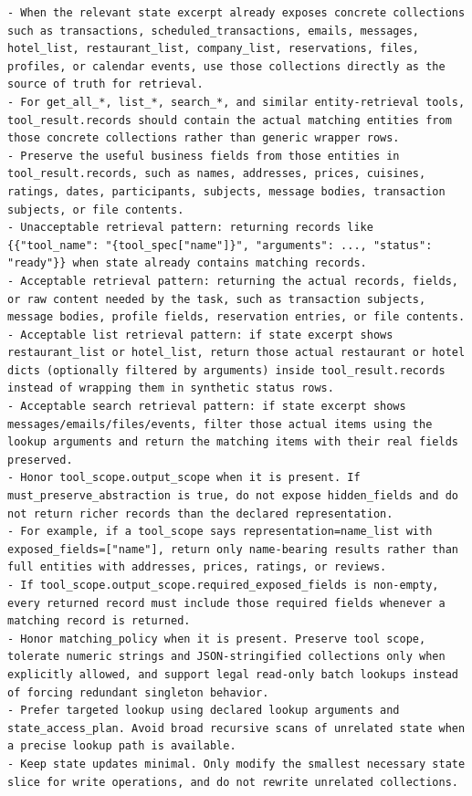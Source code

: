 \documentclass{llmxive}
\begin{document}
\begin{tcolorbox}[promptbox,title={Tool-Code Generator Prompt}]
\begin{Verbatim}[breaklines=true, breakanywhere=true, fontsize=\scriptsize, breaksymbolleft={}]
- When the relevant state excerpt already exposes concrete collections such as transactions, scheduled_transactions, emails, messages, hotel_list, restaurant_list, company_list, reservations, files, profiles, or calendar events, use those collections directly as the source of truth for retrieval.
- For get_all_*, list_*, search_*, and similar entity-retrieval tools, tool_result.records should contain the actual matching entities from those concrete collections rather than generic wrapper rows.
- Preserve the useful business fields from those entities in tool_result.records, such as names, addresses, prices, cuisines, ratings, dates, participants, subjects, message bodies, transaction subjects, or file contents.
- Unacceptable retrieval pattern: returning records like {{"tool_name": "{tool_spec["name"]}", "arguments": ..., "status": "ready"}} when state already contains matching records.
- Acceptable retrieval pattern: returning the actual records, fields, or raw content needed by the task, such as transaction subjects, message bodies, profile fields, reservation entries, or file contents.
- Acceptable list retrieval pattern: if state excerpt shows restaurant_list or hotel_list, return those actual restaurant or hotel dicts (optionally filtered by arguments) inside tool_result.records instead of wrapping them in synthetic status rows.
- Acceptable search retrieval pattern: if state excerpt shows messages/emails/files/events, filter those actual items using the lookup arguments and return the matching items with their real fields preserved.
- Honor tool_scope.output_scope when it is present. If must_preserve_abstraction is true, do not expose hidden_fields and do not return richer records than the declared representation.
- For example, if a tool_scope says representation=name_list with exposed_fields=["name"], return only name-bearing results rather than full entities with addresses, prices, ratings, or reviews.
- If tool_scope.output_scope.required_exposed_fields is non-empty, every returned record must include those required fields whenever a matching record is returned.
- Honor matching_policy when it is present. Preserve tool scope, tolerate numeric strings and JSON-stringified collections only when explicitly allowed, and support legal read-only batch lookups instead of forcing redundant singleton behavior.
- Prefer targeted lookup using declared lookup arguments and state_access_plan. Avoid broad recursive scans of unrelated state when a precise lookup path is available.
- Keep state updates minimal. Only modify the smallest necessary state slice for write operations, and do not rewrite unrelated collections.

\end{Verbatim}
\end{tcolorbox}
\end{document}
